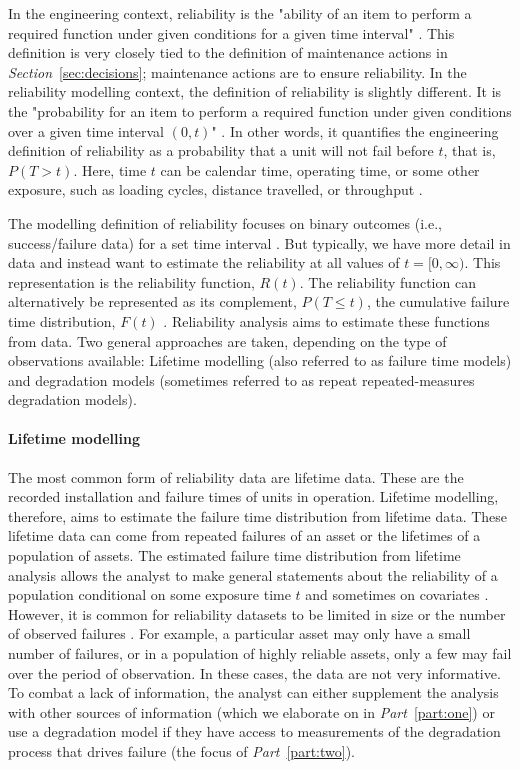 In the engineering context, reliability is the "ability of an item to perform a required function under given conditions for a given time interval" \citep{ISO_14224_2016}. This definition is very closely tied to the definition of maintenance actions in \textit{Section}~\ref{sec:decisions}; maintenance actions are to ensure reliability. In the reliability modelling context, the definition of reliability is slightly different. It is the "probability for an item to perform a required function under given conditions over a given time interval $(0, t)$" \citep{ISO_12489_2013}. In other words, it quantifies the engineering definition of reliability as a probability that a unit will not fail before $t$, that is, $P(T > t)$. Here, time $t$ can be calendar time, operating time, or some other exposure, such as loading cycles, distance travelled, or throughput \citep{lee2006}.

The modelling definition of reliability focuses on binary outcomes (i.e., success/failure data) for a set time interval \citep{hamada2008}. But typically, we have more detail in data and instead want to estimate the reliability at all values of $t = [0, \infty)$. This representation is the reliability function, $R(t)$. The reliability function can alternatively be represented as its complement, $P(T \le t)$, the cumulative failure time distribution, $F(t)$ \citep{meeker2022}. Reliability analysis aims to estimate these functions from data. Two general approaches are taken, depending on the type of observations available: Lifetime modelling (also referred to as failure time models) and degradation models (sometimes referred to as repeat repeated-measures degradation models).

\paragraph*{Lifetime modelling} 

The most common form of reliability data are lifetime data. These are the recorded installation and failure times of units in operation. Lifetime modelling, therefore, aims to estimate the failure time distribution from lifetime data. These lifetime data can come from repeated failures of an asset or the lifetimes of a population of assets. The estimated failure time distribution from lifetime analysis allows the analyst to make general statements about the reliability of a population conditional on some exposure time $t$ and sometimes on covariates \cite{moore2016}. However, it is common for reliability datasets to be limited in size or the number of observed failures \citep{meeker2022}. For example, a particular asset may only have a small number of failures, or in a population of highly reliable assets, only a few may fail over the period of observation. In these cases, the data are not very informative. To combat a lack of information, the analyst can either supplement the analysis with other sources of information (which we elaborate on in \textit{Part}~\ref{part:one}) or use a degradation model if they have access to measurements of the degradation process that drives failure (the focus of \textit{Part}~\ref{part:two}).

